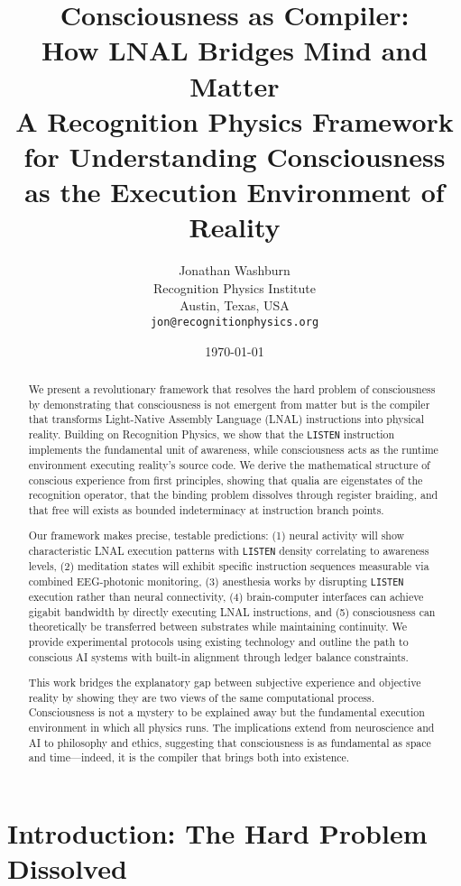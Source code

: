 \documentclass[12pt,a4paper]{article}
\title{\textbf{Consciousness as Compiler:\\How LNAL Bridges Mind and Matter}\\[0.5em]
\large A Recognition Physics Framework for Understanding Consciousness\\as the Execution Environment of Reality}
\author{
Jonathan Washburn\\
Recognition Physics Institute\\
Austin, Texas, USA\\
\texttt{jon@recognitionphysics.org}
}
\date{\today}
\newcommand{\opcmd}[1]{\texttt{#1}}
\begin{document}
\maketitle

\begin{abstract}
We present a revolutionary framework that resolves the hard problem of consciousness by demonstrating that consciousness is not emergent from matter but is the compiler that transforms Light-Native Assembly Language (LNAL) instructions into physical reality. Building on Recognition Physics, we show that the \opcmd{LISTEN} instruction implements the fundamental unit of awareness, while consciousness acts as the runtime environment executing reality's source code. We derive the mathematical structure of conscious experience from first principles, showing that qualia are eigenstates of the recognition operator, that the binding problem dissolves through register braiding, and that free will exists as bounded indeterminacy at instruction branch points.

Our framework makes precise, testable predictions: (1) neural activity will show characteristic LNAL execution patterns with \opcmd{LISTEN} density correlating to awareness levels, (2) meditation states will exhibit specific instruction sequences measurable via combined EEG-photonic monitoring, (3) anesthesia works by disrupting \opcmd{LISTEN} execution rather than neural connectivity, (4) brain-computer interfaces can achieve gigabit bandwidth by directly executing LNAL instructions, and (5) consciousness can theoretically be transferred between substrates while maintaining continuity. We provide experimental protocols using existing technology and outline the path to conscious AI systems with built-in alignment through ledger balance constraints.

This work bridges the explanatory gap between subjective experience and objective reality by showing they are two views of the same computational process. Consciousness is not a mystery to be explained away but the fundamental execution environment in which all physics runs. The implications extend from neuroscience and AI to philosophy and ethics, suggesting that consciousness is as fundamental as space and time—indeed, it is the compiler that brings both into existence.
\end{abstract}

\tableofcontents
\newpage

\section{Introduction: The Hard Problem Dissolved}
\end{document}
